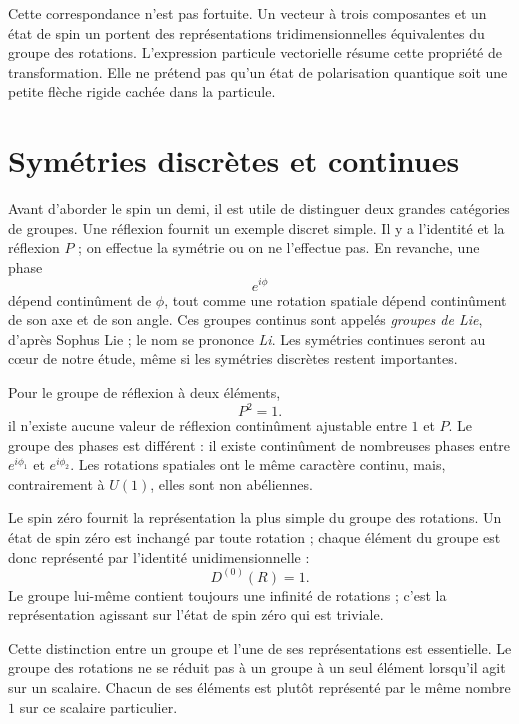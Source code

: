 Cette correspondance n’est pas fortuite. Un vecteur à trois composantes et un état de spin un portent des représentations tridimensionnelles équivalentes du groupe des rotations. L’expression {particule vectorielle} résume cette propriété de transformation. Elle ne prétend pas qu’un état de polarisation quantique soit une petite flèche rigide cachée dans la particule.

\section{Symétries discrètes et continues}

Avant d’aborder le spin un demi, il est utile de distinguer deux grandes catégories de groupes. Une réflexion fournit un exemple discret simple. Il y a l’identité et la réflexion \(P\) ; on effectue la symétrie ou on ne l’effectue pas. En revanche, une phase
\begin{equation}
e^{i\phi}
\end{equation}
dépend continûment de \(\phi\), tout comme une rotation spatiale dépend continûment de son axe et de son angle. Ces groupes continus sont appelés \emph{groupes de Lie}, d’après Sophus Lie ; le nom se prononce \emph{Li}. Les symétries continues seront au cœur de notre étude, même si les symétries discrètes restent importantes.

Pour le groupe de réflexion à deux éléments,
\begin{equation}
P^2=1.
\end{equation}
il n’existe aucune valeur de réflexion continûment ajustable entre \(1\) et \(P\). Le groupe des phases est différent : il existe continûment de nombreuses phases entre \(e^{i\phi_1}\) et \(e^{i\phi_2}\). Les rotations spatiales ont le même caractère continu, mais, contrairement à \(U(1)\), elles sont non abéliennes.

Le spin zéro fournit la représentation la plus simple du groupe des rotations. Un état de spin zéro est inchangé par toute rotation ; chaque élément du groupe est donc représenté par l’identité unidimensionnelle :
\begin{equation}
D^{(0)}(R)=1.
\end{equation}
Le groupe lui-même contient toujours une infinité de rotations ; c’est la représentation agissant sur l’état de spin zéro qui est triviale.

Cette distinction entre un groupe et l’une de ses représentations est essentielle. Le groupe des rotations ne se réduit pas à un groupe à un seul élément lorsqu’il agit sur un scalaire. Chacun de ses éléments est plutôt représenté par le même nombre \(1\) sur ce scalaire particulier.

